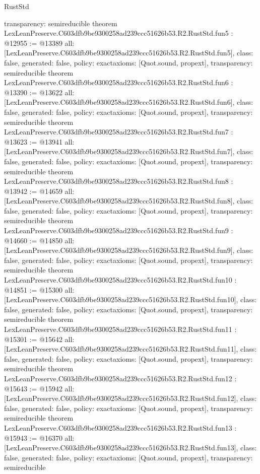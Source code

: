 \begin{lexlean}{RustStd}
\begin{coremodule}
{  transparency: semireducible
}
theorem LexLeanPreserve.C603dfb9be9300258ad239ccc51626b53.R2.RustStd.fun5 : @12955 := @13389 {
  all: [LexLeanPreserve.C603dfb9be9300258ad239ccc51626b53.R2.RustStd.fun5],
  class: false,
  generated: false,
  policy: exact{axioms: [Quot.sound, propext]},
  transparency: semireducible
}
theorem LexLeanPreserve.C603dfb9be9300258ad239ccc51626b53.R2.RustStd.fun6 : @13390 := @13622 {
  all: [LexLeanPreserve.C603dfb9be9300258ad239ccc51626b53.R2.RustStd.fun6],
  class: false,
  generated: false,
  policy: exact{axioms: [Quot.sound, propext]},
  transparency: semireducible
}
theorem LexLeanPreserve.C603dfb9be9300258ad239ccc51626b53.R2.RustStd.fun7 : @13623 := @13941 {
  all: [LexLeanPreserve.C603dfb9be9300258ad239ccc51626b53.R2.RustStd.fun7],
  class: false,
  generated: false,
  policy: exact{axioms: [Quot.sound, propext]},
  transparency: semireducible
}
theorem LexLeanPreserve.C603dfb9be9300258ad239ccc51626b53.R2.RustStd.fun8 : @13942 := @14659 {
  all: [LexLeanPreserve.C603dfb9be9300258ad239ccc51626b53.R2.RustStd.fun8],
  class: false,
  generated: false,
  policy: exact{axioms: [Quot.sound, propext]},
  transparency: semireducible
}
theorem LexLeanPreserve.C603dfb9be9300258ad239ccc51626b53.R2.RustStd.fun9 : @14660 := @14850 {
  all: [LexLeanPreserve.C603dfb9be9300258ad239ccc51626b53.R2.RustStd.fun9],
  class: false,
  generated: false,
  policy: exact{axioms: [Quot.sound, propext]},
  transparency: semireducible
}
theorem LexLeanPreserve.C603dfb9be9300258ad239ccc51626b53.R2.RustStd.fun10 : @14851 := @15300 {
  all: [LexLeanPreserve.C603dfb9be9300258ad239ccc51626b53.R2.RustStd.fun10],
  class: false,
  generated: false,
  policy: exact{axioms: [Quot.sound, propext]},
  transparency: semireducible
}
theorem LexLeanPreserve.C603dfb9be9300258ad239ccc51626b53.R2.RustStd.fun11 : @15301 := @15642 {
  all: [LexLeanPreserve.C603dfb9be9300258ad239ccc51626b53.R2.RustStd.fun11],
  class: false,
  generated: false,
  policy: exact{axioms: [Quot.sound, propext]},
  transparency: semireducible
}
theorem LexLeanPreserve.C603dfb9be9300258ad239ccc51626b53.R2.RustStd.fun12 : @15643 := @15942 {
  all: [LexLeanPreserve.C603dfb9be9300258ad239ccc51626b53.R2.RustStd.fun12],
  class: false,
  generated: false,
  policy: exact{axioms: [Quot.sound, propext]},
  transparency: semireducible
}
theorem LexLeanPreserve.C603dfb9be9300258ad239ccc51626b53.R2.RustStd.fun13 : @15943 := @16370 {
  all: [LexLeanPreserve.C603dfb9be9300258ad239ccc51626b53.R2.RustStd.fun13],
  class: false,
  generated: false,
  policy: exact{axioms: [Quot.sound, propext]},
  transparency: semireducible
}
\end{coremodule}
\end{lexlean}
